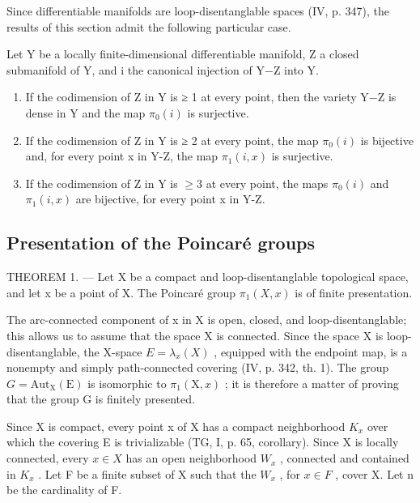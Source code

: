 Since differentiable manifolds are loop-disentanglable spaces (IV, p. 347), the results of this section admit the following particular case.

Let Y be a locally finite-dimensional differentiable manifold, Z a closed submanifold of Y, and i the canonical injection of Y−Z into Y.

\begin{enumerate}
\def\labelenumi{\alph{enumi})}
\item
  If the codimension of Z in Y is ≥ 1 at every point, then the variety Y−Z is dense in Y and the map \(\pi_{0}(i)\) is surjective.
\item
  If the codimension of Z in Y is ≥ 2 at every point, the map \(\pi_{0}(i)\) is bijective and, for every point x in Y-Z, the map \(\pi_{1}(i,x)\) is surjective.
\item
  If the codimension of Z in Y is \(\geqslant 3\) at every point, the maps \(\pi_{0}(i)\) and \(\pi_{1}(i,x)\) are bijective, for every point x in Y-Z.
\end{enumerate}

\subsection{Presentation of the Poincaré groups}

THEOREM 1. --- Let X be a compact and loop-disentanglable topological space, and let x be a point of X. The Poincaré group \(\pi_{1}(X,x)\) is of finite presentation.

The arc-connected component of x in X is open, closed, and loop-disentanglable; this allows us to assume that the space X is connected. Since the space X is loop-disentanglable, the X-space \(E = \lambda_{x}(X)\) , equipped with the endpoint map, is a nonempty and simply path-connected covering (IV, p. 342, th. 1). The group \(G = \text{Aut}_{\text{X}}(\text{E})\) is isomorphic to \(\pi_{1}(\text{X}, x)\) ; it is therefore a matter of proving that the group G is finitely presented.

Since X is compact, every point x of X has a compact neighborhood \(K_{x}\) over which the covering E is trivializable (TG, I, p. 65, corollary). Since X is locally connected, every \(x \in X\) has an open neighborhood \(W_{x}\) , connected and contained in \(K_{x}\) . Let F be a finite subset of X such that the \(W_{x}\) , for \(x \in F\) , cover X. Let n be the cardinality of F.

